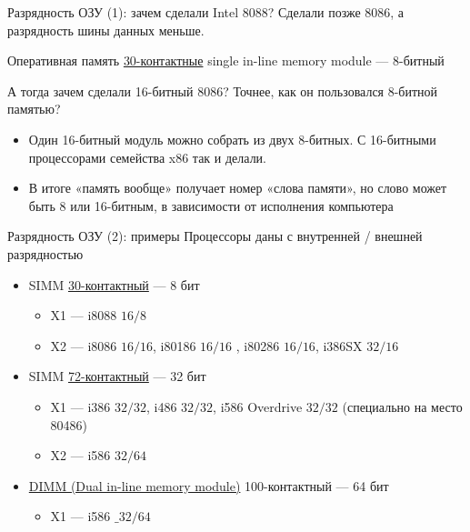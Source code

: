 \documentclass[xetex,aspectratio=43]{beamer}
\begin{document}
\begin{frame}{Разрядность ОЗУ (1): зачем сделали Intel 8088?}
Сделали позже 8086, а разрядность шины данных меньше.

\pause

Оперативная память
\href{https://en.wikipedia.org/wiki/SIMM\#30-pin_SIMMs}{30-контактные} single in-line memory module --- 8-битный

А тогда зачем сделали 16-битный 8086? Точнее, как он пользовался 8-битной памятью?

\pause

\begin{itemize}
    \item
    Один 16-битный модуль можно собрать из двух 8-битных. С 16-битными
    процессорами семейства x86 так и делали.
    \item
    В итоге «память вообще» получает номер «слова памяти», но слово может
    быть 8 или 16-битным, в зависимости от исполнения компьютера
\end{itemize}
\end{frame}

\begin{frame}{Разрядность ОЗУ (2): примеры}
Процессоры даны с внутренней / внешней разрядностью

\begin{itemize}
    \tightlist

    \item
    SIMM
    \href{https://en.wikipedia.org/wiki/SIMM\#30-pin_SIMMs}{30-контактный}
    --- 8 бит

    \begin{itemize}
        \tightlist
        \item
        X1 --- i8088 \({16/8}\)
        \item
        X2 --- i8086 \({16/16}\), i80186 \({16/16}\) , i80286
        \({16/16}\), i386SX \({32/16}\)
    \end{itemize}

    \item
    SIMM
    \href{https://en.wikipedia.org/wiki/SIMM\#72-pin_SIMMs}{72-контактный}
    --- 32 бит

    \begin{itemize}
        \tightlist
        \item
        X1 --- i386 \({32/32}\), i486 \({32/32}\), i586 Overdrive
        \({32/32}\) (специально на место 80486)
        \item
        X2 --- i586 \({32/64}\)
    \end{itemize}

    \item
    \href{https://en.wikipedia.org/wiki/DIMM}{DIMM (Dual in-line memory
        module)} 100-контактный --- 64 бит

    \begin{itemize}
        \tightlist
        \item
        X1 --- i586 \(\_{32/64}\)
    \end{itemize}
\end{itemize}

\end{frame}
\end{document}
